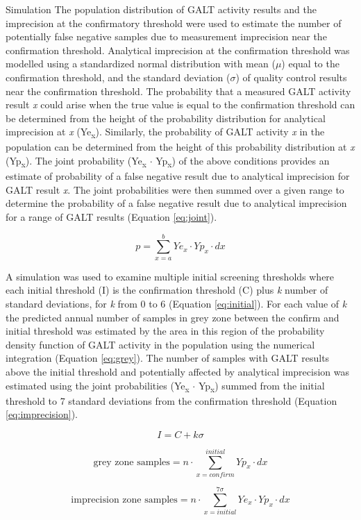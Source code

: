 \documentclass[review]{elsarticle}
\begin{document}
\begin{frame}[label={sec:org751fca3}]{Simulation}
The population distribution of GALT activity results and the
imprecision at the confirmatory threshold were used to estimate the
number of potentially false negative samples due to measurement
imprecision near the confirmation threshold. Analytical imprecision at
the confirmation threshold was modelled using a standardized normal
distribution with mean (\(\mu\)) equal to the confirmation threshold, and
the standard deviation (\(\sigma\)) of quality control results near the
confirmation threshold. The probability that a measured GALT activity
result \emph{x} could arise when the true value is equal to the confirmation
threshold can be determined from the height of the probability
distribution for analytical imprecision at \emph{x} (Ye\textsubscript{x}). Similarly, the
probability of GALT activity \emph{x} in the population can be determined
from the height of this probability distribution at \emph{x} (Yp\textsubscript{x}). The
joint probability (Ye\textsubscript{x} \(\cdot\) Yp\textsubscript{x}) of the above conditions provides
an estimate of probability of a false negative result due to analytical
imprecision for GALT result \emph{x}. The joint probabilities were then
summed over a given range to determine the probability of a false
negative result due to analytical imprecision for a range of GALT
results (Equation \ref{eq:joint}).


\begin{equation}\label{eq:joint}
p = \sum_{x=a}^b Ye_x \cdot Yp_x \cdot dx
\end{equation}

A simulation was used to examine multiple initial screening thresholds
where each initial threshold (I) is the confirmation threshold (C)
plus \emph{k} number of standard deviations, for \emph{k} from 0 to 6 (Equation
\ref{eq:initial}). For each value of \emph{k} the predicted annual number
of samples in grey zone between the confirm and initial threshold was
estimated by the area in this region of the probability density
function of GALT activity in the population using the numerical
integration (Equation \ref{eq:grey}). The number of samples with GALT
results above the initial threshold and potentially affected by
analytical imprecision was estimated using the joint probabilities
(Ye\textsubscript{x} \(\cdot\) Yp\textsubscript{x}) summed from the initial threshold to 7 standard
deviations from the confirmation threshold (Equation
\ref{eq:imprecision}).

\begin{equation}\label{eq:initial}
I = C + k\sigma 
\end{equation}

\begin{equation}\label{eq:grey}
\text{grey zone samples}  =  n \cdot \sum_{x=confirm}^{initial} Yp_x \cdot dx
\end{equation}

\begin{equation}\label{eq:imprecision}
\text{imprecision zone samples}  =  n \cdot \sum_{x=initial}^{7\sigma} Ye_x \cdot Yp_x \cdot dx
\end{equation}
\end{frame}
\end{document}

